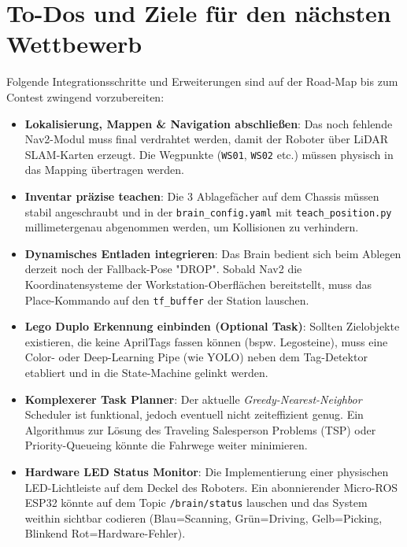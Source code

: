 \documentclass[12pt,a4paper]{article}
\begin{document}
\section{To-Dos und Ziele für den nächsten Wettbewerb}
Folgende Integrationsschritte und Erweiterungen sind auf der Road-Map bis zum Contest zwingend vorzubereiten:
\begin{itemize}
    \item \textbf{Lokalisierung, Mappen \& Navigation abschließen}: Das noch fehlende Nav2-Modul muss final verdrahtet werden, damit der Roboter über LiDAR SLAM-Karten erzeugt. Die Wegpunkte (\texttt{WS01}, \texttt{WS02} etc.) müssen physisch in das Mapping übertragen werden.
    \item \textbf{Inventar präzise teachen}: Die 3 Ablagefächer auf dem Chassis müssen stabil angeschraubt und in der \texttt{brain\_config.yaml} mit \texttt{teach\_position.py} millimetergenau abgenommen werden, um Kollisionen zu verhindern.
    \item \textbf{Dynamisches Entladen integrieren}: Das Brain bedient sich beim Ablegen derzeit noch der Fallback-Pose "DROP". Sobald Nav2 die Koordinatensysteme der Workstation-Oberflächen bereitstellt, muss das Place-Kommando auf den \texttt{tf\_buffer} der Station lauschen.
    \item \textbf{Lego Duplo Erkennung einbinden (Optional Task)}: Sollten Zielobjekte existieren, die keine AprilTags fassen können (bspw. Legosteine), muss eine Color- oder Deep-Learning Pipe (wie YOLO) neben dem Tag-Detektor etabliert und in die State-Machine gelinkt werden.
    \item \textbf{Komplexerer Task Planner}: Der aktuelle \textit{Greedy-Nearest-Neighbor} Scheduler ist funktional, jedoch eventuell nicht zeiteffizient genug. Ein Algorithmus zur Lösung des Traveling Salesperson Problems (TSP) oder Priority-Queueing könnte die Fahrwege weiter minimieren.
    \item \textbf{Hardware LED Status Monitor}: Die Implementierung einer physischen LED-Lichtleiste auf dem Deckel des Roboters. Ein abonnierender Micro-ROS ESP32 könnte auf dem Topic \texttt{/brain/status} lauschen und das System weithin sichtbar codieren (Blau=Scanning, Grün=Driving, Gelb=Picking, Blinkend Rot=Hardware-Fehler).
\end{itemize}
\end{document}

